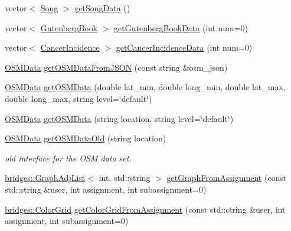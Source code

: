 \begin{DoxyCompactItemize}
\item 
vector$<$ \mbox{\hyperlink{classbridges_1_1dataset_1_1_song}{Song}} $>$ \mbox{\hyperlink{classbridges_1_1_data_source_a5e8d035a1becf96c71569e0966e93849}{get\+Song\+Data}} ()
\item 
vector$<$ \mbox{\hyperlink{classbridges_1_1dataset_1_1_gutenberg_book}{Gutenberg\+Book}} $>$ \mbox{\hyperlink{classbridges_1_1_data_source_a1057509d6adf4cbfd881854adb274304}{get\+Gutenberg\+Book\+Data}} (int num=0)
\item 
vector$<$ \mbox{\hyperlink{classbridges_1_1dataset_1_1_cancer_incidence}{Cancer\+Incidence}} $>$ \mbox{\hyperlink{classbridges_1_1_data_source_a52d8161e7c093ab3615acea7085f6689}{get\+Cancer\+Incidence\+Data}} (int num=0)
\item 
\mbox{\hyperlink{classbridges_1_1dataset_1_1_o_s_m_data}{O\+S\+M\+Data}} \mbox{\hyperlink{classbridges_1_1_data_source_a1b483de1cce9921b70116213382cdaf0}{get\+O\+S\+M\+Data\+From\+J\+S\+ON}} (const string \&osm\+\_\+json)
\item 
\mbox{\hyperlink{classbridges_1_1dataset_1_1_o_s_m_data}{O\+S\+M\+Data}} \mbox{\hyperlink{classbridges_1_1_data_source_a57736934a90bdb86948a7c338ec81a2d}{get\+O\+S\+M\+Data}} (double lat\+\_\+min, double long\+\_\+min, double lat\+\_\+max, double long\+\_\+max, string level=\char`\"{}default\char`\"{})
\item 
\mbox{\hyperlink{classbridges_1_1dataset_1_1_o_s_m_data}{O\+S\+M\+Data}} \mbox{\hyperlink{classbridges_1_1_data_source_a3151f5b2a27b5d6b11e1c5cb55d51655}{get\+O\+S\+M\+Data}} (string location, string level=\char`\"{}default\char`\"{})
\item 
\mbox{\hyperlink{classbridges_1_1dataset_1_1_o_s_m_data}{O\+S\+M\+Data}} \mbox{\hyperlink{classbridges_1_1_data_source_a3ae5e11e0b70bed0498cf37b360820c2}{get\+O\+S\+M\+Data\+Old}} (string location)
\begin{DoxyCompactList}\small\item\em old interface for the O\+SM data set. \end{DoxyCompactList}\item 
\mbox{\hyperlink{classbridges_1_1datastructure_1_1_graph_adj_list}{bridges\+::\+Graph\+Adj\+List}}$<$ int, std\+::string $>$ \mbox{\hyperlink{classbridges_1_1_data_source_ac4edf55c163c60f17b13f5499e5d2e65}{get\+Graph\+From\+Assignment}} (const std\+::string \&user, int assignment, int subassignment=0)
\item 
\mbox{\hyperlink{classbridges_1_1datastructure_1_1_color_grid}{bridges\+::\+Color\+Grid}} \mbox{\hyperlink{classbridges_1_1_data_source_aa65136879011e1ec237380ef8587fea2}{get\+Color\+Grid\+From\+Assignment}} (const std\+::string \&user, int assignment, int subassignment=0)

\end{DoxyCompactItemize}
